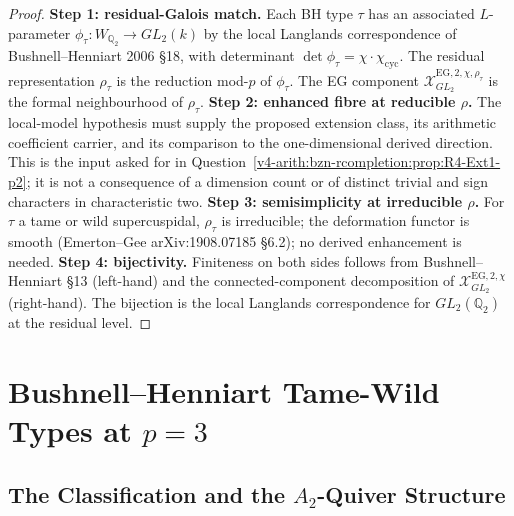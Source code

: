 \begin{proof}
\textbf{Step 1: residual-Galois match.} Each BH type \(\tau\) has an
associated \(L\)-parameter
\(\phi_{\tau}\colon W_{\mathbb{Q}_{2}}\to GL_{2}(k)\) by the local
Langlands correspondence of Bushnell--Henniart 2006 \S 18, with
determinant \(\det\phi_{\tau}=\chi\cdot\chi_{\mathrm{cyc}}\).
The residual representation \(\rho_{\tau}\) is the reduction mod-\(p\) of
\(\phi_{\tau}\). The EG component
\(\mathcal{X}^{\mathrm{EG},2,\chi,\rho_{\tau}}_{GL_{2}}\) is the formal
neighbourhood of \(\rho_{\tau}\).
\textbf{Step 2: enhanced fibre at reducible \(\rho\).}
The local-model hypothesis must supply the proposed extension class,
its arithmetic coefficient carrier, and its comparison to the
one-dimensional derived direction. This is the input asked for in
Question~\ref{v4-arith:bzn-rcompletion:prop:R4-Ext1-p2}; it is not
a consequence of a dimension count or of distinct trivial and sign
characters in characteristic two.
\textbf{Step 3: semisimplicity at irreducible \(\rho\).} For \(\tau\) a
tame or wild supercuspidal, \(\rho_{\tau}\) is irreducible; the
deformation functor is smooth (Emerton--Gee arXiv:1908.07185 \S 6.2);
no derived enhancement is needed.
\textbf{Step 4: bijectivity.} Finiteness on both sides follows from
Bushnell--Henniart \S 13 (left-hand) and the connected-component
decomposition of \(\mathcal{X}^{\mathrm{EG},2,\chi}_{GL_{2}}\)
(right-hand). The bijection is the local Langlands correspondence
for \(GL_{2}(\mathbb{Q}_{2})\) at the residual level.
\end{proof}

\section{Bushnell--Henniart Tame-Wild Types at \(p=3\)}
\label{v4-arith:f1a3-BH:BH-p3}

\subsection{The Classification and the \(A_{2}\)-Quiver Structure}


